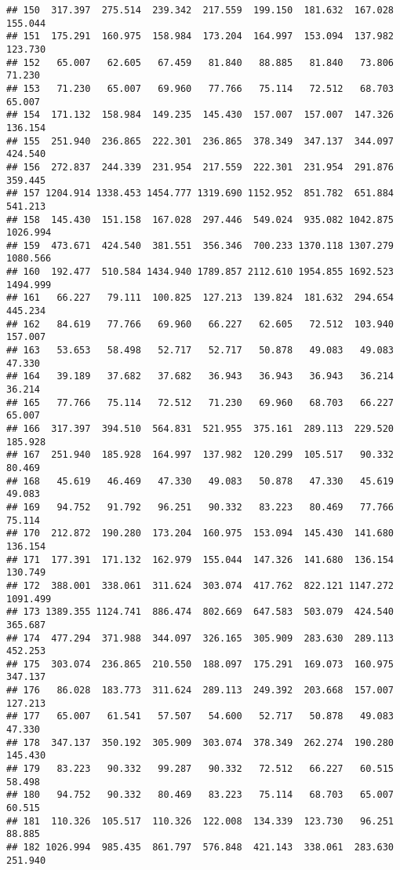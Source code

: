 \documentclass[
]{article}
\begin{document}
\begin{verbatim}
## 150  317.397  275.514  239.342  217.559  199.150  181.632  167.028  155.044
## 151  175.291  160.975  158.984  173.204  164.997  153.094  137.982  123.730
## 152   65.007   62.605   67.459   81.840   88.885   81.840   73.806   71.230
## 153   71.230   65.007   69.960   77.766   75.114   72.512   68.703   65.007
## 154  171.132  158.984  149.235  145.430  157.007  157.007  147.326  136.154
## 155  251.940  236.865  222.301  236.865  378.349  347.137  344.097  424.540
## 156  272.837  244.339  231.954  217.559  222.301  231.954  291.876  359.445
## 157 1204.914 1338.453 1454.777 1319.690 1152.952  851.782  651.884  541.213
## 158  145.430  151.158  167.028  297.446  549.024  935.082 1042.875 1026.994
## 159  473.671  424.540  381.551  356.346  700.233 1370.118 1307.279 1080.566
## 160  192.477  510.584 1434.940 1789.857 2112.610 1954.855 1692.523 1494.999
## 161   66.227   79.111  100.825  127.213  139.824  181.632  294.654  445.234
## 162   84.619   77.766   69.960   66.227   62.605   72.512  103.940  157.007
## 163   53.653   58.498   52.717   52.717   50.878   49.083   49.083   47.330
## 164   39.189   37.682   37.682   36.943   36.943   36.943   36.214   36.214
## 165   77.766   75.114   72.512   71.230   69.960   68.703   66.227   65.007
## 166  317.397  394.510  564.831  521.955  375.161  289.113  229.520  185.928
## 167  251.940  185.928  164.997  137.982  120.299  105.517   90.332   80.469
## 168   45.619   46.469   47.330   49.083   50.878   47.330   45.619   49.083
## 169   94.752   91.792   96.251   90.332   83.223   80.469   77.766   75.114
## 170  212.872  190.280  173.204  160.975  153.094  145.430  141.680  136.154
## 171  177.391  171.132  162.979  155.044  147.326  141.680  136.154  130.749
## 172  388.001  338.061  311.624  303.074  417.762  822.121 1147.272 1091.499
## 173 1389.355 1124.741  886.474  802.669  647.583  503.079  424.540  365.687
## 174  477.294  371.988  344.097  326.165  305.909  283.630  289.113  452.253
## 175  303.074  236.865  210.550  188.097  175.291  169.073  160.975  347.137
## 176   86.028  183.773  311.624  289.113  249.392  203.668  157.007  127.213
## 177   65.007   61.541   57.507   54.600   52.717   50.878   49.083   47.330
## 178  347.137  350.192  305.909  303.074  378.349  262.274  190.280  145.430
## 179   83.223   90.332   99.287   90.332   72.512   66.227   60.515   58.498
## 180   94.752   90.332   80.469   83.223   75.114   68.703   65.007   60.515
## 181  110.326  105.517  110.326  122.008  134.339  123.730   96.251   88.885
## 182 1026.994  985.435  861.797  576.848  421.143  338.061  283.630  251.940

\end{verbatim}
\end{document}

